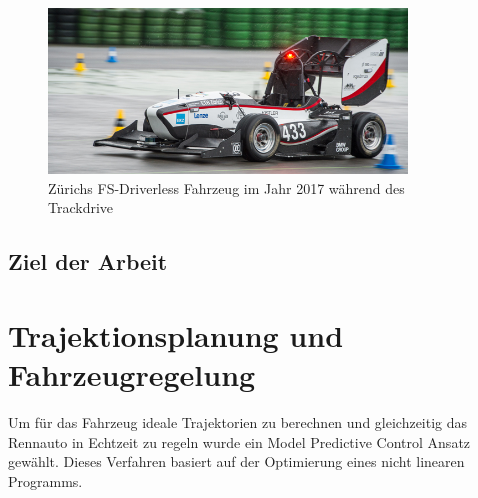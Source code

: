 \documentclass{like}
\begin{document}
\begin{figure}[hb!]
	\centering
	\includegraphics[width=270pt]{Abbildungen/amz-driverless-long.jpg}
	\caption{Zürichs FS-Driverless Fahrzeug im Jahr 2017 während des Trackdrive}
\end{figure}

\section{Ziel der Arbeit}



\chapter{Trajektionsplanung und Fahrzeugregelung}

Um für das Fahrzeug ideale Trajektorien zu berechnen und gleichzeitig das Rennauto in Echtzeit zu regeln wurde ein Model Predictive Control Ansatz gewählt. Dieses Verfahren basiert auf der Optimierung eines nicht linearen Programms.

 
 
\end{document}
